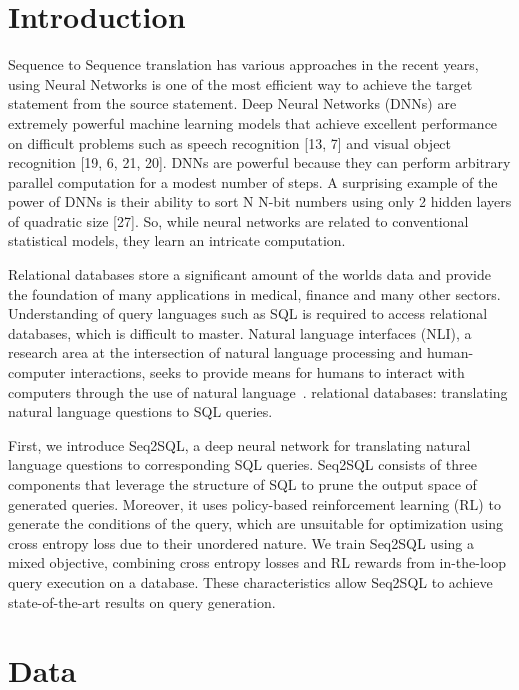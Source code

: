\documentclass{article}
\begin{document}
\section{Introduction}

Sequence to Sequence translation has various approaches in the recent years, using Neural Networks is one of the most efficient way to achieve the target statement from the source statement. Deep Neural Networks (DNNs) are extremely powerful machine learning models that achieve excellent performance on difficult problems such as speech recognition [13, 7] and visual object recognition [19, 6, 21, 20]. DNNs are powerful because they can perform arbitrary parallel computation
for a modest number of steps. A surprising example of the power of DNNs is their ability to sort
N N-bit numbers using only 2 hidden layers of quadratic size [27]. So, while neural networks are
related to conventional statistical models, they learn an intricate computation.

Relational databases store a significant amount of the worlds data and provide the foundation of many applications in medical, finance and many other sectors. Understanding of query languages such as SQL is required to access relational databases, which is difficult to
master. Natural language interfaces (NLI), a research area at the intersection of natural language
processing and human-computer interactions, seeks to provide means for humans to interact with
computers through the use of natural language~\cite{androutsopoulos1995natural}. relational databases: translating natural language questions to
SQL queries.

First, we introduce Seq2SQL, a deep neural
network for translating natural language questions to corresponding SQL queries. Seq2SQL consists of three components that leverage the structure of SQL to prune the output
space of generated queries. Moreover, it uses policy-based reinforcement learning (RL) to generate
the conditions of the query, which are unsuitable for optimization using cross entropy loss due
to their unordered nature. We train Seq2SQL using a mixed objective, combining cross entropy
losses and RL rewards from in-the-loop query execution on a database. These characteristics allow
Seq2SQL to achieve state-of-the-art results on query generation.


\section{Data}
\end{document}
